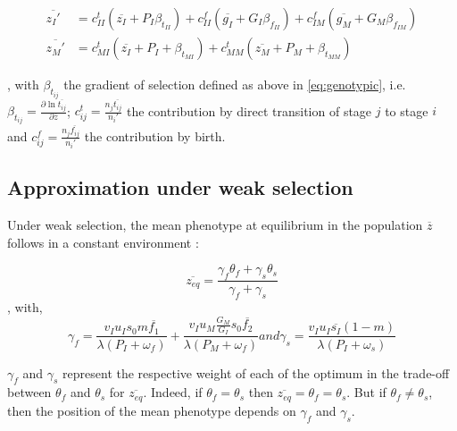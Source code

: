 \begin{subequations}
	\begin{align}
	\label{eq:phenotypic}
	\overline{z_I'} &= c_{II}^t (\overline{z_I} + P_I \beta_{t_{II}}) + c_{II}^f (\overline{g_I} + G_I \beta_{f_{II}}) + c_{IM}^f (\overline{g_M} + G_M \beta_{f_{IM}}) \\
	\overline{z_M'} &= c_{MI}^t (\overline{z_I} + P_I + \beta_{t_{MI}}) + c_{MM}^t (\overline{z_M} + P_M + \beta_{t_{MM}})
	\end{align}
\end{subequations}

, with $\beta_{t_{ij}}$ the gradient of selection defined as above in \autoref{eq:genotypic}, i.e. $\beta_{t_{ij}} = \frac{\partial \ln \overline{t_{ij}}}{\partial \overline{z}}$; $c_{ij}^t = \frac{n_j \overline{t_{ij}}}{n_i'}$ the contribution by direct transition of stage $j$ to stage $i$ and $c_{ij}^f = \frac{n_j \overline{f_{ij}}}{n_i'}$ the contribution by birth.

\subsection*{Approximation under weak selection}

Under weak selection, the mean phenotype at equilibrium in the population $\overline{z}$ follows in a constant environment \citep{engen_evolution_2011}:

\begin{equation}
	\label{eq:zweak}
	\overline{z_{eq}} = \frac{\gamma_{f}\theta_{f} + \gamma_{s}\theta_{s}}{\gamma_{f} + \gamma_{s}}
\end{equation}
, with,
\begin{subequations}
	\begin{equation}
	\label{eq:gammaf}
	\gamma_{f} = \frac{v_{I} u_{I} s_{0} m \overline{f_{1}} }{\lambda(P_{I}+\omega_{f})} + \frac{ v_{I} u_{M} \frac{G_{M}}{G_{I}} s_{0} \overline{f_{2}}}{\lambda ( P_{M} + \omega_{f} )}
	\end{equation}
	and
	\begin{equation}
	\label{eq:gammas}
	\gamma_{s} = \frac{ v_{I} u_{I} \overline{s_{I}} (1-m) }{\lambda(P_{I}+\omega_{s})}
	\end{equation}
\end{subequations}

$\gamma_f$ and $\gamma_s$ represent the respective weight of each of the optimum in the trade-off between $\theta_f$ and $\theta_s$ for $\overline{z_{eq}}$. Indeed, if $\theta_f = \theta_s$ then $\overline{z_{eq}} = \theta_f = \theta_s$. But if $\theta_f \neq \theta_s$, then the position of the mean phenotype depends on $\gamma_f$ and $\gamma_s$.

